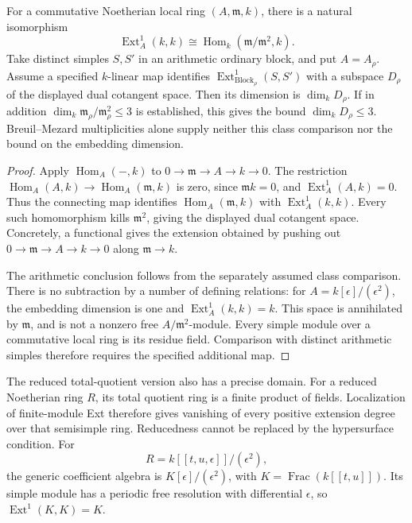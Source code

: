 \begin{proposition}
\label{v4-arith:ic:w5-f:F1a3-AB:prop:Ext1-ordinary-controlled}
For a commutative Noetherian local ring \((A,\mathfrak m,k)\),
there is a natural isomorphism
\[
 \operatorname{Ext}^1_A(k,k)\cong
 \operatorname{Hom}_k(\mathfrak m/\mathfrak m^2,k).
\]
Take distinct simples \(S,S'\) in an arithmetic ordinary block,
and put \(A=A_\rho\). Assume a specified \(k\)-linear map identifies
\(\operatorname{Ext}^1_{\mathrm{Block}_\rho}(S,S')\) with a subspace
\(D_\rho\) of the displayed dual cotangent space.
Then its dimension is \(\dim_k D_\rho\). If in addition
\(\dim_k\mathfrak m_\rho/\mathfrak m_\rho^2\leq3\) is established,
this gives the bound \(\dim_k D_\rho\leq3\).
Breuil--Mezard multiplicities alone supply neither this class
comparison nor the bound on the embedding dimension.
\end{proposition}
\begin{proof}
Apply \(\operatorname{Hom}_A(-,k)\) to
\(0\to\mathfrak m\to A\to k\to0\).
The restriction \(\operatorname{Hom}_A(A,k)\to
\operatorname{Hom}_A(\mathfrak m,k)\) is zero, since
\(\mathfrak m k=0\), and \(\operatorname{Ext}^1_A(A,k)=0\).
Thus the connecting map identifies \(\operatorname{Hom}_A(\mathfrak m,k)\)
with \(\operatorname{Ext}^1_A(k,k)\). Every such homomorphism kills
\(\mathfrak m^2\), giving the displayed dual cotangent space.
Concretely, a functional gives the extension obtained by pushing out
\(0\to\mathfrak m\to A\to k\to0\) along \(\mathfrak m\to k\).

The arithmetic conclusion follows from the separately assumed class
comparison. There is no subtraction by a number of defining relations:
for \(A=k[\epsilon]/(\epsilon^2)\), the embedding dimension is one
and \(\operatorname{Ext}^1_A(k,k)=k\). This space is annihilated by
\(\mathfrak m\), and is not a nonzero free \(A/\mathfrak m^2\)-module.
Every simple module over a commutative local ring is its residue field.
Comparison with distinct arithmetic simples therefore requires the
specified additional map.
\end{proof}


The reduced total-quotient version also has a precise domain.
For a reduced Noetherian ring \(R\), its total quotient ring is
a finite product of fields. Localization of finite-module Ext
therefore gives vanishing of every positive extension degree
over that semisimple ring.
Reducedness cannot be replaced by the hypersurface condition.
For
\[
 R=k[[t,u,\epsilon]]/(\epsilon^2),
\]
the generic coefficient algebra is
\(K[\epsilon]/(\epsilon^2)\), with
\(K=\operatorname{Frac}(k[[t,u]])\).
Its simple module has a periodic free resolution with differential
\(\epsilon\), so \(\operatorname{Ext}^1(K,K)=K\).

